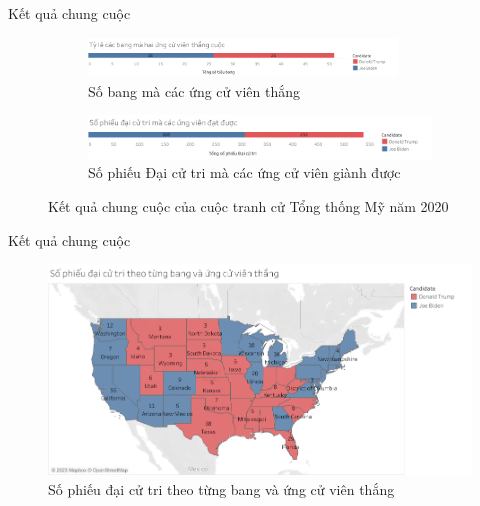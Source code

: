 \documentclass[10pt]{beamer}
\theoremstyle{remark}
\theoremstyle{definition}
\begin{document}
\begin{frame}{Kết quả chung cuộc}
	\begin{figure}[h!]
        \centering
        \begin{subfigure}[b]{\textwidth}
            \includegraphics[width=0.9\textwidth]{figures/State_Candidate_Win.png}
            \caption{Số bang mà các ứng cử viên thắng}
        \end{subfigure}
        \vfill
        \begin{subfigure}[b]{\linewidth}
            \includegraphics[width=0.9\linewidth]{figures/Electoral_Vote_Candidate_Win.png}
            \caption{Số phiếu Đại cử tri mà các ứng cử viên giành được}
        \end{subfigure}
        \caption{Kết quả chung cuộc của cuộc tranh cử Tổng thống Mỹ năm 2020}
    \end{figure}
\end{frame}

\begin{frame}{Kết quả chung cuộc}
	\begin{figure}[h!]
        \centering
        \includegraphics[width=\textwidth]{Electoral_Votes_States.png}
        \caption{Số phiếu đại cử tri theo từng bang và ứng cử viên thắng}
    \end{figure}
\end{frame}
\end{document}
